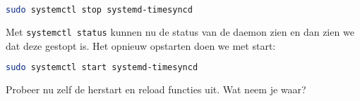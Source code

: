 \begin{lstlisting}[language=bash]
sudo systemctl stop systemd-timesyncd
\end{lstlisting}

Met \texttt{systemctl status} kunnen nu de status van de daemon zien en dan zien we dat deze gestopt is. Het opnieuw opstarten doen we met start:

\begin{lstlisting}[language=bash]
sudo systemctl start systemd-timesyncd
\end{lstlisting}

Probeer nu zelf de herstart en reload functies uit. Wat neem je waar?

